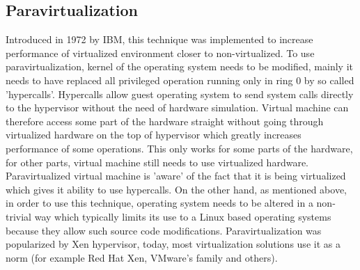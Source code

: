 \subsection{Paravirtualization} \label{paravirtualization}
Introduced in 1972 by IBM, this technique was implemented to increase performance of virtualized environment closer to non-virtualized. To use paravirtualization, kernel of the operating system needs to be modified, mainly it needs to have replaced all privileged operation running only in ring 0 by so called 'hypercalls'. Hypercalls allow guest operating system to send system calls directly to the hypervisor without the need of hardware simulation. Virtual machine can therefore access some part of the hardware straight without going through virtualized hardware on the top of hypervisor which greatly increases performance of some operations. This only works for some parts of the hardware, for other parts, virtual machine still needs to use virtualized hardware. Paravirtualized virtual machine is 'aware' of the fact that it is being virtualized which gives it ability to use hypercalls. On the other hand, as mentioned above, in order to use this technique, operating system needs to be altered in a non-trivial way which typically limits its use to a Linux based operating systems because they allow such source code modifications.
Paravirtualization was popularized by Xen hypervisor, today, most virtualization solutions use it as a norm (for example Red Hat Xen, VMware's family and others).

